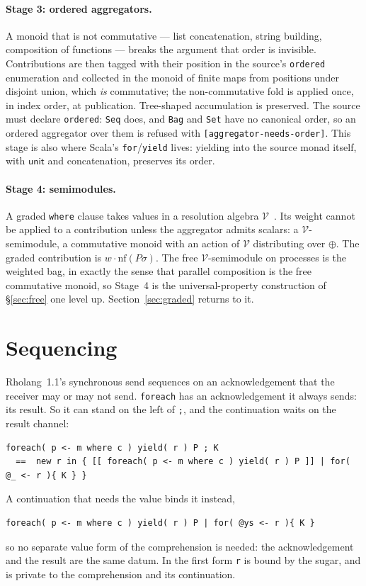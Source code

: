 \documentclass[11pt]{article}
\theoremstyle{branddef}
\theoremstyle{brandplain}
\theoremstyle{brandrem}
\newcommand{\unit}{\mathsf{unit}}
\newcommand{\nf}{\mathrm{nf}}
\newcommand{\fe}{\texttt{foreach}}
\begin{document}
\paragraph{Stage 3: ordered aggregators.} A monoid that is not commutative ---
list concatenation, string building, composition of functions --- breaks the
argument that order is invisible. Contributions are then tagged with their
position in the source's \texttt{ordered} enumeration and collected in the
monoid of finite maps from positions under disjoint union, which \emph{is}
commutative; the non-commutative fold is applied once, in index order, at
publication. Tree-shaped accumulation is preserved. The source must declare
\texttt{ordered}: \texttt{Seq} does, and \texttt{Bag} and \texttt{Set} have no
canonical order, so an ordered aggregator over them is refused with
\texttt{[aggregator-needs-order]}. This stage is also where Scala's
\texttt{for}/\texttt{yield} lives: yielding into the source monad itself, with
\(\unit\) and concatenation, preserves its order.

\paragraph{Stage 4: semimodules.} A graded \texttt{where} clause takes values in
a resolution algebra \(\mathcal V\)~\cite{GradedWhere}. Its weight cannot be
applied to a contribution unless the aggregator admits scalars: a
\(\mathcal V\)-semimodule, a commutative monoid with an action of \(\mathcal V\)
distributing over \(\oplus\). The graded contribution is \(w \cdot
\nf(P\sigma)\). The free \(\mathcal V\)-semimodule on processes is the weighted
bag, in exactly the sense that parallel composition is the free commutative
monoid, so Stage~4 is the universal-property construction of
\S\ref{sec:free} one level up. Section~\ref{sec:graded} returns to it.

\section{Sequencing}
\label{sec:seq}

Rholang~1.1's synchronous send sequences on an acknowledgement that the
receiver may or may not send. \fe{} has an acknowledgement it always sends: its
result. So it can stand on the left of \texttt{;}, and the continuation waits on
the result channel:
\begin{lstlisting}
foreach( p <- m where c ) yield( r ) P ; K
  ==  new r in { [[ foreach( p <- m where c ) yield( r ) P ]] | for( @_ <- r ){ K } }
\end{lstlisting}
A continuation that needs the value binds it instead,
\begin{lstlisting}
foreach( p <- m where c ) yield( r ) P | for( @ys <- r ){ K }
\end{lstlisting}
so no separate value form of the comprehension is needed: the acknowledgement
and the result are the same datum. In the first form \texttt{r} is bound by the
sugar, and is private to the comprehension and its continuation.
\end{document}

